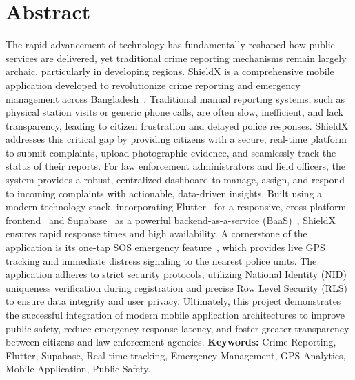 \documentclass[12pt, a4paper, twoside]{report}
\begin{document}
\chapter*{Abstract}
The rapid advancement of technology has fundamentally reshaped how public services are delivered, yet traditional crime reporting mechanisms remain largely archaic, particularly in developing regions. ShieldX is a comprehensive mobile application developed to revolutionize crime reporting and emergency management across Bangladesh~\cite{smp}. Traditional manual reporting systems, such as physical station visits or generic phone calls, are often slow, inefficient, and lack transparency, leading to citizen frustration and delayed police responses. 
ShieldX addresses this critical gap by providing citizens with a secure, real-time platform to submit complaints, upload photographic evidence, and seamlessly track the status of their reports. For law enforcement administrators and field officers, the system provides a robust, centralized dashboard to manage, assign, and respond to incoming complaints with actionable, data-driven insights. Built using a modern technology stack, incorporating Flutter~\cite{flutter} for a responsive, cross-platform frontend~\cite{crossplat} and Supabase~\cite{supabase} as a powerful backend-as-a-service (BaaS)~\cite{baas}, ShieldX ensures rapid response times and high availability. 
A cornerstone of the application is its one-tap SOS emergency feature~\cite{sos}, which provides live GPS tracking and immediate distress signaling to the nearest police units. The application adheres to strict security protocols, utilizing National Identity (NID) uniqueness verification during registration and precise Row Level Security (RLS)~\cite{rls} to ensure data integrity and user privacy. Ultimately, this project demonstrates the successful integration of modern mobile application architectures to improve public safety, reduce emergency response latency, and foster greater transparency between citizens and law enforcement agencies.
\vspace{0.5cm}
\noindent\textbf{Keywords:} Crime Reporting, Flutter, Supabase, Real-time tracking, Emergency Management, GPS Analytics, Mobile Application, Public Safety.
\tableofcontents
\clearpage
\listoffigures
{}
\listoftables
{}
\clearpage
\end{document}
